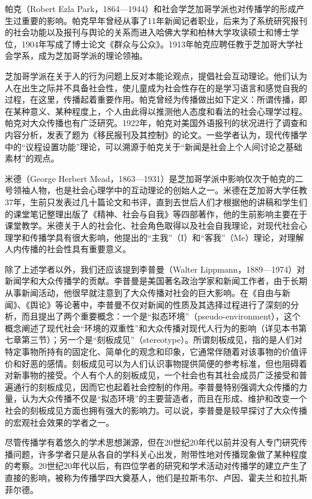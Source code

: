 \documentclass[UTF8,12pt]{ctexart}
\numberwithin{equation}{section} %
\numberwithin{figure}{section}
\numberwithin{table}{section}
\begin{document}
	帕克（Robert Ezla Park，1864—1944）和社会学芝加哥学派也对传播学的形成产生过重要的影响。帕克早年曾经从事了11年新闻记者职业，后来为了系统研究报刊的社会功能以及报刊与舆论的关系而进入哈佛大学和柏林大学攻读硕士和博士学位，1904年写成了博士论文《群众与公众》。1913年帕克应聘任教于芝加哥大学社会学系，成为芝加哥学派的理论领袖。
	
	芝加哥学派在关于人的行为问题上反对本能论观点，提倡社会互动理论。他们认为人在出生之际并不具备社会性，使儿童成为社会性存在的是学习语言和感觉自我的过程，在这里，传播起着重要作用。帕克曾经为传播做出如下定义：所谓传播，即在某种意义、某种程度上，个人由此得以推测他人态度和看法的社会心理学过程。帕克对大众传播也有广泛研究。1922年，帕克对美国外语报刊的状况进行了调查和内容分析，发表了题为《移民报刊及其控制》的论文。一些学者认为，现代传播学中的“议程设置功能”理论，可以溯源于帕克关于“新闻是社会上个人间讨论之基础素材”的观点。
	
	米德（George Herbert Mead，1863—1931）是芝加哥学派中影响仅次于帕克的二号领袖人物，也是社会心理学中的互动理论的创始人之一。米德在芝加哥大学任教37年，生前只发表过几十篇论文和书评，直到去世后人们才根据他的讲稿和学生们的课堂笔记整理出版了《精神、社会与自我》等四部著作，他的生前影响主要在于课堂教学。米德关于人的社会化、社会角色取得以及社会自我理论，对现代社会心理学和传播学具有很大影响，他提出的“主我”（I）和“客我”（Me）理论，对理解人内传播的社会性具有重要意义。
	
	除了上述学者以外，我们还应该提到李普曼（Walter Lippmann，1889—1974）对新闻学和大众传播学的贡献。李普曼是美国著名政治学家和新闻工作者，由于长期从事新闻活动，他很早就注意到了大众传播对社会的巨大影响。在《自由与新闻》、《舆论》等论著中，李普曼不仅对新闻的性质及其选择过程进行了深刻的分析，而且提出了两个重要概念：一个是“拟态环境”（pseudo-environment），这个概念阐述了现代社会“环境的双重性”和大众传播对现代人行为的影响（详见本书第七章第三节）；另一个是“刻板成见”（stereotype）。所谓刻板成见，指的是人们对特定事物所持有的固定化、简单化的观念和印象，它通常伴随着对该事物的价值评价和好恶的感情。刻板成见可以为人们认识事物提供简便的参考标准，但也阻碍着对新事物的接受。个人有个人的刻板成见，一个社会也有其社会成员广泛接受和普遍通行的刻板成见，因而它也起着社会控制的作用。李普曼特别强调大众传播的力量，认为大众传播不仅是“拟态环境”的主要营造者，而且在形成、维护和改变一个社会的刻板成见方面也拥有强大的影响力。可以说，李普曼是较早探讨了大众传播的宏观社会效果的学者之一。
	
	
	
	尽管传播学有着悠久的学术思想渊源，但在20世纪20年代以前并没有人专门研究传播问题，许多学者只是从各自的学科关心出发，附带性地对传播现象做了某种程度的考察。20世纪20年代以后，有四位学者的研究和学术活动对传播学的建立产生了直接的影响，被称为传播学四大奠基人，他们是拉斯韦尔、卢因、霍夫兰和拉扎斯菲尔德。
	
\end{document}
